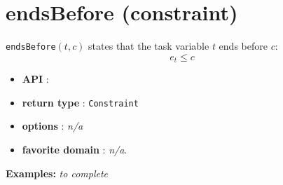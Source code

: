 \section{endsBefore (constraint)}\label{endsbefore:endsbeforeconstraint}\hypertarget{endsbefore:endsbeforeconstraint}{}
\begin{notedef}
  \texttt{endsBefore}$(t,c)$ states that the task variable $t$ ends before $c$:
  $$e_t \le c$$
\end{notedef}

\begin{itemize}
	\item \textbf{API} :
	\item \textbf{return type} : \texttt{Constraint}
	\item \textbf{options} : \emph{n/a}
	\item \textbf{favorite domain} : \emph{n/a}.
\end{itemize}

\textbf{Examples:}
%
\emph{to complete}
